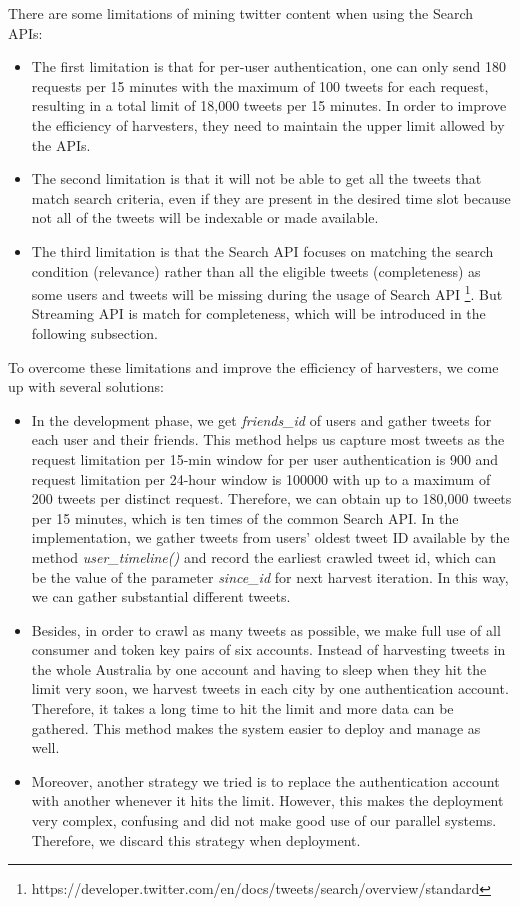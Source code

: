 \documentclass{article}
\begin{document}
There are some limitations of mining twitter content when using the Search APIs:
\begin{itemize}
    \item The first limitation is that for per-user authentication, one can only send 180 requests per 15 minutes with the maximum of 100 tweets for each request, resulting in a total limit of 18,000 tweets per 15 minutes. In order to improve the efficiency of harvesters, they need to maintain the upper limit allowed by the APIs.
    \item The second limitation is that it will not be able to get all the tweets that match search criteria, even if they are present in the desired time slot because not all of the tweets will be indexable or made available.
    \item The third limitation is that the Search API focuses on matching the search condition (relevance) rather than all the eligible tweets (completeness) as some users and tweets will be missing during the usage of Search API
    \footnote{https://developer.twitter.com/en/docs/tweets/search/overview/standard}. But Streaming API is match for completeness, which will be introduced in the following subsection.
\end{itemize}
To overcome these limitations and improve the efficiency of harvesters, we come up with several solutions:
\begin{itemize}
    \item In the development phase, we get \textit{friends\_id} of users and gather tweets for each user and their friends. This method helps us capture most tweets as the request limitation per 15-min window for per user authentication is 900 and request limitation per 24-hour window is 100000 with up to a maximum of 200 tweets per distinct request. Therefore, we can obtain up to 180,000 tweets per 15 minutes, which is ten times of the common Search API. In the implementation, we gather tweets from users’ oldest tweet ID available by the method \textit{user\_timeline()} and record the earliest crawled tweet id, which can be the value of the parameter \textit{since\_id} for next harvest iteration. In this way, we can gather substantial different tweets.
    \item Besides, in order to crawl as many tweets as possible, we make full use of all consumer and token key pairs of six accounts. Instead of harvesting tweets in the whole Australia by one account and having to sleep when they hit the limit very soon, we harvest tweets in each city by one authentication account. Therefore, it takes a long time to hit the limit and more data can be gathered. This method makes the system easier to deploy and manage as well.
    \item Moreover, another strategy we tried is to replace the authentication account with another whenever it hits the limit. However, this makes the deployment very complex, confusing and did not make good use of our parallel systems. Therefore, we discard this strategy when deployment.
\end{itemize}
\end{document}
